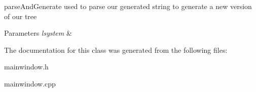 parse\+And\+Generate used to parse our generated string to generate a new version of our tree 


\begin{DoxyParams}{Parameters}
{\em lsystem} & \\
\hline
\end{DoxyParams}


The documentation for this class was generated from the following files\+:\begin{DoxyCompactItemize}
\item 
mainwindow.\+h\item 
mainwindow.\+cpp\end{DoxyCompactItemize}
